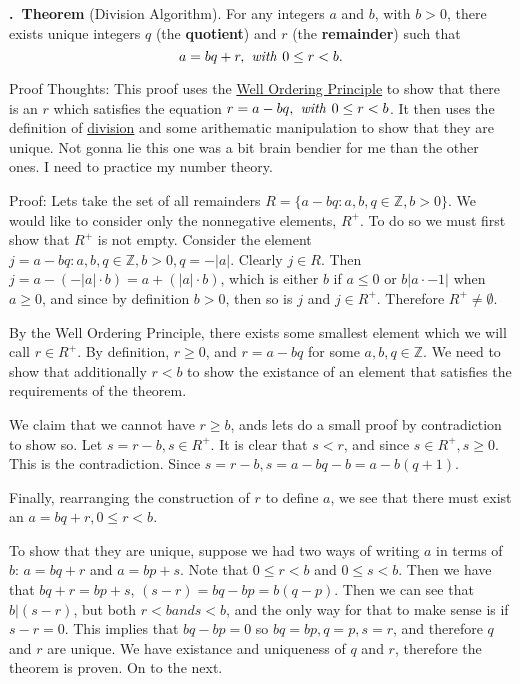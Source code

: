 \documentclass[12pt, oneside]{book}
\newcommand{\Integers}{\mathbb{Z}}
\newcounter{definition}[section]
\renewcommand\thedefinition{\thesection.\arabic{definition}}
\newcommand\define[1]{%
   \refstepcounter{definition}%
   \noindent\textbf{\thedefinition~#1}\label{def:\thedefinition}
}
\begin{document}
\define{Theorem} (Division Algorithm). For any integers \(a\) and \(b\), with \(b > 0\), there exists unique integers \(q\) (the \textbf{quotient}) and \(r\) (the \textbf{remainder}) such that \[a = bq + r, \text{\textit{ with }} 0 \leq r < b.\]

Proof Thoughts: This proof uses the \hyperref[def:1.1.2]{Well Ordering Principle} to show that there is an \(r\) which satisfies the equation \(r = a - bq, \text{\textit{ with }} 0 \leq r < b\). It then uses the definition of \hyperref[def:1.1.1]{division} and some arithematic manipulation to show that they are unique. Not gonna lie this one was a bit brain bendier for me than the other ones. I need to practice my number theory.

Proof: Lets take the set of all remainders \(R = \{a - bq : a, b, q \in \Integers, b > 0\}\). We would like to consider only the nonnegative elements, \(R^+\). To do so we must first show that \(R^+\) is not empty. Consider the element \(j = a - bq: a, b, q\in \Integers, b > 0, q = -|a|\). Clearly \(j \in R\). Then \(j = a - (-|a| \cdot b) = a + (|a| \cdot b)\), which is either \(b\) if \(a \leq 0\) or \(b |a \cdot- 1|\) when \(a \geq 0\), and since by definition \( b > 0\), then so is \(j\) and \(j \in R^+\). Therefore \(R^+ \neq \emptyset\).

By the Well Ordering Principle, there exists some smallest element which we will call \(r \in R^+\). By definition, \(r \geq 0\), and \(r = a - bq\) for some \(a, b, q \in \Integers\). We need to show that additionally \(r < b\) to show the existance of an element that satisfies the requirements of the theorem.

We claim that we cannot have \( r \geq b\), ands lets do a small proof by contradiction to show so. Let \(s = r - b, s \in R^+\). It is clear that \(s < r\), and since \(s \in R^+, s \geq 0\). This is the contradiction. Since \(s = r - b, s = a - bq - b = a - b(q + 1)\).

Finally, rearranging the construction of \(r\) to define \(a\), we see that there must exist an \(a = bq + r, 0 \leq r < b\).

To show that they are unique, suppose we had two ways of writing \(a\) in terms of \(b\): \(a = bq + r \) and \(a = bp + s\). Note that \(0 \leq r < b\) and \(0 \leq s < b\). Then we have that \(bq + r = bp + s\), \((s - r) = bq - bp = b(q-p)\). Then we can see that \(b|(s-r)\), but both \(r < b and s < b\), and the only way for that to make sense is if \(s - r = 0\). This implies that \(bq - bp = 0\) so \(bq = bp, q = p, s = r\), and therefore \(q\) and  \(r\) are unique. We have existance and uniqueness of \(q\) and  \(r\), therefore the theorem is proven. On to the next.
\end{document}
